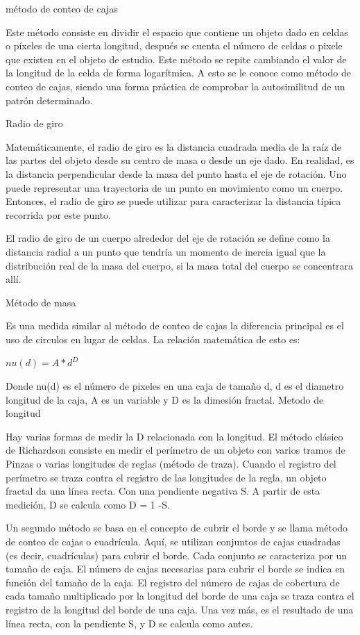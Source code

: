 \documentclass[11pt]{article}
\begin{document}
método de conteo de cajas

Este método consiste en dividir el espacio que contiene un objeto dado en celdas o píxeles de una cierta longitud, después se cuenta el número de celdas o pixele que existen en el objeto de estudio. Este método se repite cambiando el valor de la longitud de la celda de forma logarítmica. 
A esto se le conoce como método de conteo de cajas, siendo una forma práctica de comprobar la autosimilitud de un patrón determinado. 

Radio de giro

Matemáticamente, el radio de giro es la distancia cuadrada media de la raíz de las partes del objeto desde su centro de masa o desde un eje dado. En realidad, es la distancia perpendicular desde la masa del punto hasta el eje de rotación. Uno puede representar una trayectoria de un punto en movimiento como un cuerpo. Entonces, el radio de giro se puede utilizar para caracterizar la distancia típica recorrida por este punto.

El radio de giro de un cuerpo alrededor del eje de rotación se define como la distancia radial a un punto que tendría un momento de inercia igual que la distribución real de la masa del cuerpo, si la masa total del cuerpo se concentrara allí.

Método de masa

Es una medida similar al método de conteo de cajas la diferencia principal es el uso de circulos en lugar de celdas. La relación matemática de esto es:

$nu(d) = A*d^D$

Donde nu(d) es el número de pixeles en una caja de tamaño d, d es el diametro longitud de la caja, A es un variable y D es la dimesión fractal. 
Metodo de longitud 

Hay varias formas de medir la D relacionada con la longitud. El método clásico de Richardson consiste en medir el perímetro de un objeto con varios tramos de Pinzas o varias longitudes de reglas (método de traza). Cuando el registro del perímetro se traza contra el registro de las longitudes de la regla, un objeto fractal da una línea recta. Con una pendiente negativa S. A partir de esta medición, D se calcula como D = 1 -S.

Un segundo método se basa en el concepto de cubrir el borde y se llama método de conteo de cajas o cuadrícula. Aquí, se utilizan conjuntos de cajas cuadradas (es decir, cuadrículas) para cubrir el borde. Cada conjunto se caracteriza por un tamaño de caja. El número de cajas necesarias para cubrir el borde se indica en función del tamaño de la caja. El registro del número de cajas de cobertura de cada tamaño multiplicado por la longitud del borde de una caja se traza contra el registro de la longitud del borde de una caja. Una vez más, es el resultado de una línea recta, con la pendiente S, y D se calcula como antes.
\end{document}
